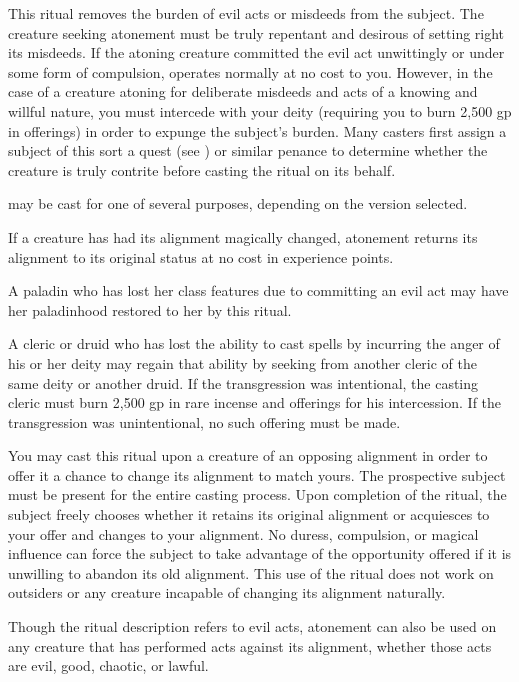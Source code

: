 \begin{spelleffect}
This ritual removes the burden of evil acts or misdeeds from the subject. The creature seeking atonement must be truly repentant and desirous of setting right its misdeeds. If the atoning creature committed the evil act unwittingly or under some form of compulsion,  operates normally at no cost to you. However, in the case of a creature atoning for deliberate misdeeds and acts of a knowing and willful nature, you must intercede with your deity (requiring you to burn 2,500 gp in offerings) in order to expunge the subject's burden. Many casters first assign a subject of this sort a quest (see ) or similar penance to determine whether the creature is truly contrite before casting the  ritual on its behalf.
\par {} may be cast for one of several purposes, depending on the version selected.
\par {} If a creature has had its alignment magically changed, atonement returns its alignment to its original status at no cost in experience points.
\par {} A paladin who has lost her class features due to committing an evil act may have her paladinhood restored to her by this ritual.
\par {} A cleric or druid who has lost the ability to cast spells by incurring the anger of his or her deity may regain that ability by seeking  from another cleric of the same deity or another druid. If the transgression was intentional, the casting cleric must burn 2,500 gp in rare incense and offerings for his intercession. If the transgression was unintentional, no such offering must be made.
\par {} You may cast this ritual upon a creature of an opposing alignment in order to offer it a chance to change its alignment to match yours. The prospective subject must be present for the entire casting process. Upon completion of the ritual, the subject freely chooses whether it retains its original alignment or acquiesces to your offer and changes to your alignment. No duress, compulsion, or magical influence can force the subject to take advantage of the opportunity offered if it is unwilling to abandon its old alignment. This use of the ritual does not work on outsiders or any creature incapable of changing its alignment naturally.
\par Though the ritual description refers to evil acts, atonement can also be used on any creature that has performed acts against its alignment, whether those acts are evil, good, chaotic, or lawful.
\end{spelleffect}
